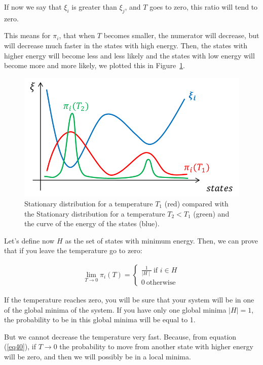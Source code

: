 If now we say that $\xi_i$ is greater than $\xi_j$, and $T$ goes to zero, this ratio will tend to zero.

This means for $\pi_i$, that when $T$ becomes smaller, the numerator will decrease, but will decrease much faster in the states with high energy. Then, the states with higher energy will become less and less likely and the states with low energy will become more and more likely, we plotted this in Figure~\ref{figur15}.

\begin{figure}[h!]
\centering
\includegraphics[scale=.7]{probabilityStates}
\caption{Stationary distribution for a temperature $T_1$ (red) compared with the Stationary distribution for a temperature $T_2 < T_1$ (green) and the curve of the energy of the states (blue).}
\label{figur15}
\end{figure}

Let's define now $H$ as the set of states with minimum energy. Then, we can prove that if you leave the temperature go to zero:

\begin{equation}
\begin{aligned}
\lim_{T \to 0} \pi_i(T) = 
\begin{cases}
\frac{1}{\mid H \mid}\ \mbox{if } i \in H\\
0\ \mbox{otherwise }
\end{cases}
\end{aligned}
\label{eq46}
\end{equation}

If the temperature reaches zero, you will be sure that your system will be in one of the global minima of the system. If you have only one global minima $\mid H \mid = 1$, the probability to be in this global minima will be equal to 1.

But we cannot decrease the temperature very fast. Because, from equation (\ref{eq40}), if $T \to 0$ the probability to move from another state with higher energy will be zero, and then we will possibly be in a local minima.

